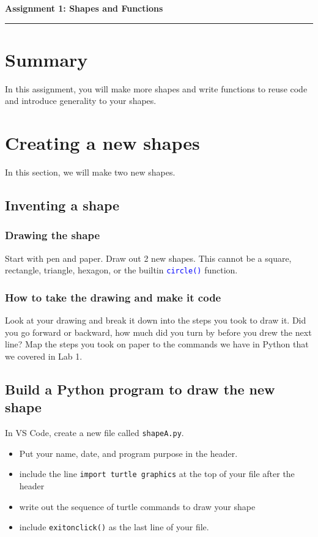 \documentclass[12pt]{article}
\begin{document}
\begin{center}
  {\Large {\bf Assignment 1: Shapes and Functions}}
  
\end{center}

\vspace{5pt}
\hrule
\vspace{5pt}

\section{Summary}
In this assignment, you will make more shapes and write functions to reuse code and introduce generality to your shapes. 

\section{Creating a new shapes}
In this section, we will make two new shapes. 

\subsection{Inventing a shape}
\subsubsection{Drawing the shape}
Start with pen and paper.
Draw out 2 new shapes.
This cannot be a square, rectangle, triangle, hexagon, or the builtin \texttt{\textcolor{blue}{circle()}} function.

\subsubsection{How to take the drawing and make it code}
Look at your drawing and break it down into the steps you took to draw it.
Did you go forward or backward, how much did you turn by before you drew the next line?
Map the steps you took on paper to the commands we have in Python that we covered in Lab 1. 

\subsection{Build a Python program to draw the new shape}
In VS Code, create a new file called \texttt{shapeA.py}.
\begin{itemize}
\item Put your name, date, and program purpose in the header.
\item include the line \texttt{import turtle graphics} at the top of your file after the header
\item write out the sequence of turtle commands to draw your shape
\item include \texttt{exitonclick()} as the last line of your file.
\end{itemize}
\end{document}
